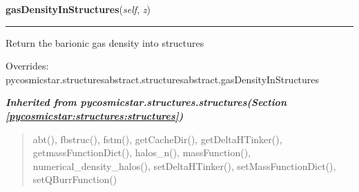     \vspace{0.5ex}

\hspace{.8\funcindent}\begin{boxedminipage}{\funcwidth}

    \raggedright \textbf{gasDensityInStructures}(\textit{self}, \textit{z})

    \vspace{-1.5ex}

    \rule{\textwidth}{0.5\fboxrule}
\setlength{\parskip}{2ex}
    Return the barionic gas density into structures

\setlength{\parskip}{1ex}
      Overrides: pycosmicstar.structuresabstract.structuresabstract.gasDensityInStructures

    \end{boxedminipage}


\large{\textbf{\textit{Inherited from pycosmicstar.structures.structures\textit{(Section \ref{pycosmicstar:structures:structures})}}}}

\begin{quote}
abt(), fbstruc(), fstm(), getCacheDir(), getDeltaHTinker(), getmassFunctionDict(), halos\_n(), massFunction(), numerical\_density\_halos(), setDeltaHTinker(), setMassFunctionDict(), setQBurrFunction()
\end{quote}
